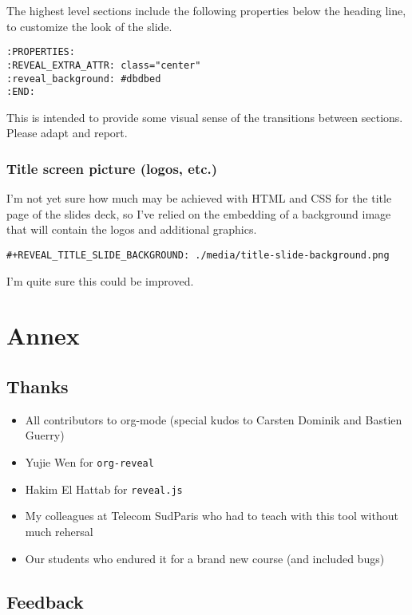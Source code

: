 \documentclass[a4paper]{article}
\begin{document}
The highest level sections include the following properties below the heading line, to customize the look of the slide. 

\begin{verbatim}
:PROPERTIES:
:REVEAL_EXTRA_ATTR: class="center"
:reveal_background: #dbdbed
:END:
\end{verbatim}

This is intended to provide some visual sense of the transitions between sections. Please adapt and report.

\subsubsection{Title screen picture (logos, etc.)}
\label{sec:org5c188f5}

I'm not yet sure how much may be achieved with HTML and CSS for the
title page of the slides deck, so I've relied on the embedding of a
background image that will contain the logos and additional graphics. 

\begin{verbatim}
#+REVEAL_TITLE_SLIDE_BACKGROUND: ./media/title-slide-background.png
\end{verbatim}

I'm quite sure this could be improved.


\section{Annex}
\label{sec:orgb94cd6b}

\subsection{Thanks}
\label{sec:org7290bc6}

\begin{itemize}
\item All contributors to org-mode (special kudos to Carsten Dominik and Bastien Guerry)
\item Yujie Wen for \texttt{org-reveal}
\item Hakim El Hattab for \texttt{reveal.js}
\item My colleagues at Telecom SudParis who had to teach with this tool without much rehersal
\item Our students who endured it for a brand new course (and included bugs)
\end{itemize}

\subsection{Feedback}
\label{sec:orgece67ef}
\end{document}
